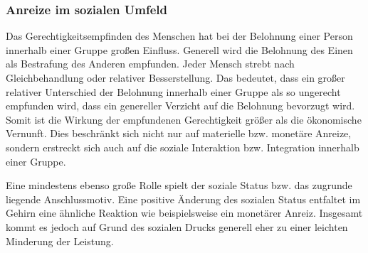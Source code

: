 \subsubsection{Anreize im sozialen Umfeld}
\label{sec:AnreizeImSozialenUmfeld}
Das Gerechtigkeitsempfinden des Menschen hat bei der Belohnung einer Person innerhalb einer Gruppe großen Einfluss. Generell wird die Belohnung des Einen als Bestrafung des Anderen empfunden. Jeder Mensch strebt nach Gleichbehandlung oder relativer Besserstellung. Das bedeutet, dass ein großer relativer Unterschied der Belohnung innerhalb einer Gruppe als so ungerecht empfunden wird, dass ein genereller Verzicht auf die Belohnung bevorzugt wird. Somit ist die Wirkung der empfundenen Gerechtigkeit größer als die ökonomische Vernunft. Dies beschränkt sich nicht nur auf materielle bzw. monetäre Anreize, sondern erstreckt sich auch auf die soziale Interaktion bzw. Integration innerhalb einer Gruppe. \citep[S. 81ff]{Nowka.2013}
 
Eine mindestens ebenso große Rolle spielt der soziale Status bzw. das zugrunde liegende Anschlussmotiv. Eine positive Änderung des sozialen Status entfaltet im Gehirn eine ähnliche Reaktion wie beispielsweise ein monetärer Anreiz. Insgesamt kommt es jedoch auf Grund des sozialen Drucks generell eher zu einer leichten Minderung der Leistung. \citep[S. 84]{Nowka.2013}

